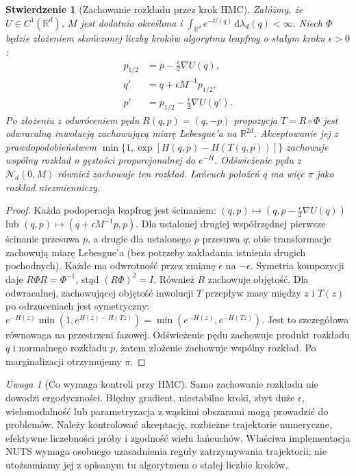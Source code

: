 \documentclass[11pt,a4paper,oneside]{report}
\numberwithin{equation}{chapter}
\theoremstyle{plain}
\newtheorem{stwierdzenie}[twierdzenie]{Stwierdzenie}
\theoremstyle{definition}
\theoremstyle{remark}
\newtheorem{uwaga}{Uwaga}[chapter]
\newcommand{\R}{\mathbb R}
\newcommand{\dd}{\mathrm d}
\newcommand{\Normal}{\mathcal N}
\begin{document}
\begin{stwierdzenie}[Zachowanie rozkładu przez krok HMC]
\label{prop:hmc-step}
Załóżmy, że $U\in C^1(\R^d)$, $M$ jest dodatnio
określona i $\int_{\R^d}e^{-U(q)}\,\dd\lambda_d(q)<\infty$.
Niech $\Phi$ będzie złożeniem skończonej liczby
kroków algorytmu leapfrog o stałym kroku $\epsilon>0$:
\[
 \begin{aligned}
 p_{1/2}&=p-\tfrac\epsilon2\nabla U(q),\\
 q'&=q+\epsilon M^{-1}p_{1/2},\\
 p'&=p_{1/2}-\tfrac\epsilon2\nabla U(q').
 \end{aligned}
\]
Po złożeniu z odwróceniem pędu $R(q,p)=(q,-p)$
propozycja $T=R\circ\Phi$ jest odwracalną inwolucją
zachowującą miarę Lebesgue'a na $\R^{2d}$.
Akceptowanie jej z prawdopodobieństwem
$\min\{1,\exp[H(q,p)-H(T(q,p))]\}$ zachowuje
wspólny rozkład o gęstości proporcjonalnej do $e^{-H}$.
Odświeżenie pędu z $\Normal_d(0,M)$ również zachowuje
ten rozkład. Łańcuch położeń $q$ ma więc $\pi$
jako rozkład niezmienniczy.
\end{stwierdzenie}
\begin{proof}
Każda podoperacja leapfrog jest ścinaniem:
$(q,p)\mapsto(q,p-\frac\epsilon2\nabla U(q))$
lub $(q,p)\mapsto(q+\epsilon M^{-1}p,p)$.
Dla ustalonej drugiej współrzędnej pierwsze ścinanie
przesuwa $p$, a drugie dla ustalonego $p$ przesuwa $q$;
obie transformacje zachowują miarę Lebesgue'a
(bez potrzeby zakładania istnienia drugich pochodnych).
Każde ma odwrotność przez zmianę $\epsilon$ na $-\epsilon$.
Symetria kompozycji daje $R\Phi R=\Phi^{-1}$,
stąd $(R\Phi)^2=I$. Również $R$ zachowuje objętość.
Dla odwracalnej, zachowującej objętość inwolucji $T$
przepływ masy między $z$ i $T(z)$ po odrzuceniach
jest symetryczny:
$e^{-H(z)}\min(1,e^{H(z)-H(Tz)})
=\min(e^{-H(z)},e^{-H(Tz)})$.
Jest to szczegółowa równowaga na przestrzeni fazowej.
Odświeżenie pędu zachowuje produkt rozkładu $q$ i
normalnego rozkładu $p$, zatem złożenie zachowuje
wspólny rozkład. Po marginalizacji otrzymujemy $\pi$.
\end{proof}

\begin{uwaga}[Co wymaga kontroli przy HMC]
Samo zachowanie rozkładu nie dowodzi ergodyczności.
Błędny gradient, niestabilne kroki, zbyt duże $\epsilon$,
wielomodalność lub parametryzacja z wąskimi obszarami
mogą prowadzić do problemów. Należy kontrolować
akceptację, rozbieżne trajektorie numeryczne, efektywne
liczebności próby i zgodność wielu łańcuchów.
Właściwa implementacja NUTS wymaga osobnego uzasadnienia
reguły zatrzymywania trajektorii; nie utożsamiamy jej
z opisanym tu algorytmem o stałej liczbie kroków.
\end{uwaga}
\end{document}
